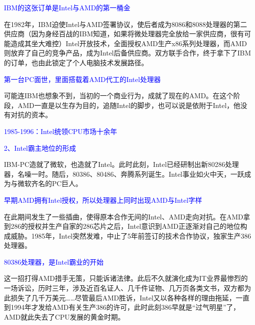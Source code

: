 \documentclass[utf8]{book}
\begin{document}
	\begin{flushleft}
		{\large \textcolor{blue}{IBM的这张订单是Intel与AMD的第一桶金}}
	\end{flushleft}
	在1982年，IBM迫使Intel与AMD签署协议，使后者成为8086和8088处理器的第二供应商（因为身经百战的IBM知道，如果将微处理器完全放给一家供应商，很有可能造成其坐大难控）Intel开放技术，全面授权AMD生产x86系列处理器，而AMD则放弃了自己的竞争产品，成为Intel后备供应商。双方联手合作，终于拿下了IBM的订单，也由此锁定了个人电脑技术发展路径。

	\begin{flushleft}
		{\large \textcolor{blue}{第一台PC面世，里面搭载着AMD代工的Intel处理器}}
	\end{flushleft}
	
	可能连IBM也想象不到，当初的一个商业行为，成就了现在的AMD。在这个阶段，AMD一直是以生存为目的，追随Intel的脚步，也可以说是依附于Intel，他没有对抗的资本。
	
	\begin{flushleft}
		{\Large \textcolor{blue}{1985-1996：Intel统领CPU市场十余年}}
	\end{flushleft}
	

	\begin{flushleft}
		{\large \textcolor{blue}{2、Intel霸主地位的形成\\}}
	\end{flushleft}

	IBM-PC造就了微软，也造就了Intel。此时此刻，Intel已经研制出新80286处理器，名噪一时。随后，80386、80486、奔腾系列诞生。Intel事业如火中天，一跃成为与微软齐名的PC巨人。

	\begin{flushleft}
		{\large \textcolor{blue}{早期AMD拥有Intel授权，所以处理器上同时出现AMD与Intel字样\\}}
	\end{flushleft}
	
	在此期间发生了一些插曲，使得原本合作无间的Intel、AMD走向对抗。在AMD拿到286的授权并生产自家的286芯片之后，Intel意识到AMD正逐渐对自己的地位构成威胁。1985年，Intel突然发难，中止了5年前签订的技术合作协议，独家生产386处理器。

	\begin{flushleft}
		{\large \textcolor{blue}{80386处理器，是Intel霸业的开始\\}}
	\end{flushleft}
	这一招打得AMD措手无策，只能诉诸法律。此后不久就演化成为IT业界最惨烈的一场诉讼，历时三年，涉及近百名证人、几千件证物、几万页各类文书，双方都为此损失了几千万美元……尽管最后AMD胜诉，Intel又以各种各样的理由拖延，一直到1994年才发给AMD有关生产386的许可，此时此刻386早就是“过气明星”了，AMD就此失去了CPU发展的黄金时期。
\end{document}
